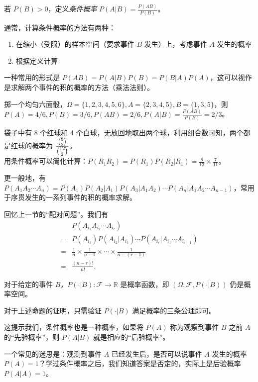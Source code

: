 \documentclass[../main.tex]{subfiles}
\begin{document}
\begin{definition}\label{def:1.6.1}
    若 $P(B)>0$，定义\emph{条件概率} $P(A|B)=\frac{P(AB)}{P(B)}$。
\end{definition}

通常，计算条件概率的方法有两种：
\begin{enumerate}
    \item 在缩小（受限）的样本空间（要求事件 $B$ 发生）上，考虑事件 $A$ 发生的概率
    \item 根据定义计算
\end{enumerate}

一种常用的形式是 $P(AB)=P(A|B)P(B)=P(B|A)P(A)$，这可以视作是求解两个事件的积的概率的方法（乘法法则）。

\begin{example}
    掷一个均匀六面骰，$\Omega=\{1,2,3,4,5,6\},A=\{2,3,4,5\},B=\{1,3,5\}$，则 $P(A)=4/6,P(B)=3/6,P(AB)=2/6,P(A|B)=\frac{P(AB)}{P(B)}=2/3$。
\end{example}

\begin{example}
    袋子中有 8 个红球和 4 个白球，无放回地取出两个球，利用组合数可知，两个都是红球的概率为 $\frac{\tbinom{8}{2}}{\tbinom{12}{2}}$。\\
    用条件概率可以简化计算：$P(R_1R_2)=P(R_1)P(R_2|R_1)=\frac{8}{12}\times\frac{7}{11}$。
\end{example}

更一般地，有 $P(A_1A_2\cdots A_n)=P(A_1)P(A_2|A_1)P(A_3|A_1A_2)\cdots P(A_n|A_1A_2\cdots A_{n-1})$，常用于序贯发生的一系列事件的积的概率求解。

\begin{example}
    回忆上一节的“配对问题”。我们有
    \begin{equation*}
        \begin{aligned}
              & P(A_{i_1}A_{i_2}\cdots A_{i_r})                                         \\
            = & P(A_{i_1})P(A_{i_2}|A_{i_1})\cdots P(A_{i_r}|A_{i_1}\cdots A_{i_{r-1}}) \\
            = & \frac{1}{n}\times\frac{1}{n-1}\times\cdots\times\frac{1}{n-(r-1)}       \\
            = & \frac{(n-r)!}{n!}.
        \end{aligned}
    \end{equation*}
\end{example}

\begin{proposition}
    对于给定的事件 $B$，$P(\cdot|B):\mathcal{F}\rightarrow\mathbb{R}$ 是概率函数，即 $(\Omega,\mathcal{F},P(\cdot|B))$ 仍是概率空间。
\end{proposition}

对于上述命题的证明，只需验证 $P(\cdot|B)$ 满足概率的三条公理即可。

这提示我们，条件概率也是一种概率，如果将 $P(A)$ 称为观察到事件 $B$ 之前 $A$ 的“先验概率”，则 $P(A|B)$ 就是相应的“后验概率”。

一个常见的迷思是：观测到事件 $A$ 已经发生后，是否可以说事件 $A$ 发生的概率 $P(A)=1$？学过条件概率之后，我们知道答案是否定的，实际上是后验概率 $P(A|A)=1$。
\end{document}
